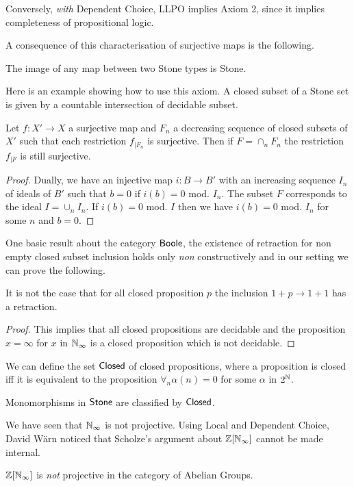 Conversely, {\em with} Dependent Choice, LLPO implies Axiom 2, since it implies completeness of propositional logic.


A consequence of this characterisation of surjective maps is the following.

\begin{proposition}
  The image of any map between two Stone types is Stone.
\end{proposition}

Here is an example showing how to use this axiom. A closed subset of a Stone set is given by a countable
intersection of decidable subset.

\begin{proposition}
  Let $f:X'\rightarrow X$ a surjective map and $F_n$ a decreasing sequence of closed subsets of $X'$ such that
  each restriction $f_{|F_n}$ is surjective. Then if $F = \cap_n F_n$ the restriction $f_{|F}$ is still surjective.
\end{proposition}

\begin{proof}
  Dually, we have an injective map $i:B\rightarrow B'$ with an increasing sequence $I_n$ of ideals of $B'$ such that
  $b = 0$ if $i(b) = 0$ mod. $I_n$. The subset $F$ corresponds to the ideal $I = \cup_n I_n$. If $i(b) = 0$ mod. $I$
  then we have $i(b) = 0$ mod. $I_n$ for some $n$ and $b = 0$. 
\end{proof}



One basic result about the category $\mathsf{Boole}$, the existence of retraction for non empty closed subset inclusion
holds only {\em non} constructively and in our setting we can prove the following.


\begin{proposition}
 It is not the case that for all closed proposition $p$ the inclusion $1+p\rightarrow 1+1$ has a retraction.
\end{proposition}

\begin{proof}
  This implies that all closed propositions are decidable and the proposition $x=\infty$ for $x$ in $\mathbb{N}_{\infty}$ is a
  closed proposition which is not decidable.
\end{proof}

\medskip

We can define the set $\mathsf{Closed}$ of closed propositions, where a proposition is closed iff it is equivalent to
the proposition $\forall_n \alpha(n) = 0$ for some $\alpha$ in $2^{\mathbb{N}}$.

\begin{theorem}
  Monomorphisms in $\mathsf{Stone}$ are classified by $\mathsf{Closed}$.
\end{theorem}

\medskip

We have seen that $\mathbb{N}_{\infty}$ is not projective. Using Local and Dependent Choice, David Wärn noticed that Scholze's argument
about $\mathbb{Z}[\mathbb{N}_{\infty}]$ cannot be made internal.

\begin{theorem}
   $\mathbb{Z}[\mathbb{N}_{\infty}]$ is {\em not} projective in the category of Abelian Groups.
\end{theorem}
